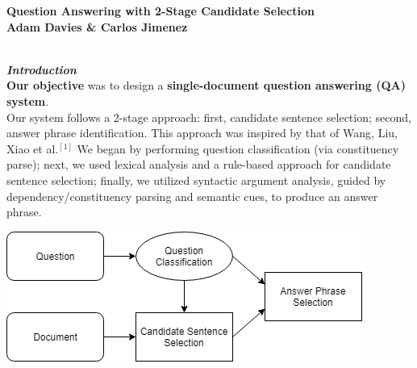 \documentclass[a1,landscape]{a0poster}
\begin{document}
\begin{minipage}[c]{0.9\linewidth}
\centering
\Huge \color{NavyBlue} \textbf{Question Answering with 2-Stage Candidate Selection} \color{Black}\\ %
\LARGE \textbf{Adam Davies \& Carlos Jimenez}\\ %
\end{minipage}



\begin{multicols}{3} %
\Large

\color{SaddleBrown} %

\textit{\textbf{\LARGE \\Introduction}}\\
\textbf{Our objective} was to design a \textbf{single-document question answering (QA) system}. \\
Our system follows a 2-stage approach: first, candidate sentence selection; second, answer phrase identification. This approach was inspired by that of Wang, Liu, Xiao et al.$^{[1]}$ We began by performing question classification (via constituency parse); next, we used lexical analysis and a rule-based approach for candidate sentence selection; finally, we utilized syntactic argument analysis, guided by dependency/constituency parsing and semantic cues, to produce an answer phrase.

\vspace{1ex}
\includegraphics[scale=1.5]{diagram-simple.png}


\end{multicols}
\end{document}
